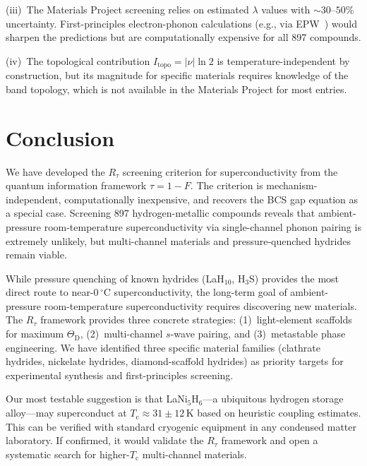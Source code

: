 \documentclass[prb,twocolumn,superscriptaddress,longbibliography,floatfix]{revtex4-2}
\newcommand{\tauasym}{\tau}
\newcommand{\Rtau}{R_{\tauasym}}
\newcommand{\Tc}{T_{\mathrm{c}}}
\newcommand{\ThetaD}{\Theta_{\mathrm{D}}}
\begin{document}
(iii)~The Materials Project screening relies on estimated $\lambda$
values with $\sim 30$--$50\%$ uncertainty.  First-principles
electron-phonon calculations (e.g., via EPW~\cite{Ponce2016})
would sharpen the predictions but are computationally expensive
for all 897 compounds.

(iv)~The topological contribution $I_{\mathrm{topo}} = |\nu|\ln 2$
is temperature-independent by construction, but its magnitude
for specific materials requires knowledge of the band topology,
which is not available in the Materials Project for most entries.

\section{Conclusion}
\label{sec:conclusion}

We have developed the $\Rtau$ screening criterion for
superconductivity from the quantum information framework
$\tauasym = 1 - F$.  The criterion is mechanism-independent,
computationally inexpensive, and recovers the BCS gap equation
as a special case.  Screening 897 hydrogen-metallic compounds
reveals that ambient-pressure room-temperature superconductivity
via single-channel phonon pairing is extremely unlikely, but
multi-channel materials and pressure-quenched hydrides remain
viable.

While pressure quenching of known hydrides (LaH$_{10}$, H$_3$S)
provides the most direct route to near-$0\,^\circ$C
superconductivity, the long-term goal of ambient-pressure
room-temperature superconductivity requires discovering new
materials.  The $\Rtau$ framework provides three concrete
strategies: (1)~light-element scaffolds for maximum $\ThetaD$,
(2)~multi-channel $s$-wave pairing, and (3)~metastable phase
engineering.  We have identified three specific material families
(clathrate hydrides, nickelate hydrides, diamond-scaffold
hydrides) as priority targets for experimental synthesis and
first-principles screening.

Our most testable suggestion is that LaNi$_5$H$_6$---a
ubiquitous hydrogen storage alloy---may superconduct at
$\Tc \approx 31 \pm 12\,$K based on heuristic coupling
estimates.  This can be verified with standard cryogenic
equipment in any condensed matter laboratory.
If confirmed, it would validate the $\Rtau$ framework and
open a systematic search for higher-$\Tc$ multi-channel materials.
\end{document}
